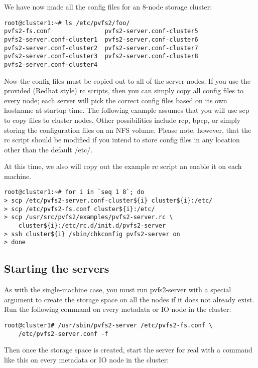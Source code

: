 \documentclass[11pt, letterpaper]{article}
\begin{document}
We have now made all the config files for an 8-node storage cluster:
\begin{verbatim}
root@cluster1:~# ls /etc/pvfs2/foo/
pvfs2-fs.conf               pvfs2-server.conf-cluster5
pvfs2-server.conf-cluster1  pvfs2-server.conf-cluster6
pvfs2-server.conf-cluster2  pvfs2-server.conf-cluster7
pvfs2-server.conf-cluster3  pvfs2-server.conf-cluster8
pvfs2-server.conf-cluster4
\end{verbatim}

Now the config files must be copied out to all of the server nodes.  If you 
use the provided (Redhat style) rc scripts, then you can simply copy all
config files to every node; each server will pick the correct config files
based on its own hostname at startup time.  The following example assumes
that you will use scp to copy files to cluster nodes.  Other possibilities
include rcp, bpcp, or simply storing the configuration files on an NFS volume.
Please note, however, that the rc script should be modified if you intend
to store config files in any location other than the default /etc/.

At this time, we also will copy out the example rc script an enable it on
each machine.

\begin{verbatim}
root@cluster1:~# for i in `seq 1 8`; do
> scp /etc/pvfs2-server.conf-cluster${i} cluster${i}:/etc/
> scp /etc/pvfs2-fs.conf cluster${i}:/etc/
> scp /usr/src/pvfs2/examples/pvfs2-server.rc \
    cluster${i}:/etc/rc.d/init.d/pvfs2-server
> ssh cluster${i} /sbin/chkconfig pvfs2-server on
> done
\end{verbatim}

\subsection{Starting the servers}

As with the single-machine case, you must run pvfs2-server with a special
argument to create the storage space on all the nodes if it does not already
exist.  Run the following command on every metadata or IO node in the cluster:

\begin{verbatim}
root@cluster1# /usr/sbin/pvfs2-server /etc/pvfs2-fs.conf \
	/etc/pvfs2-server.conf -f
\end{verbatim}

Then once the storage space is created, start the server for real with a
command like this on every metadata or IO node in the cluster:
\end{document}

